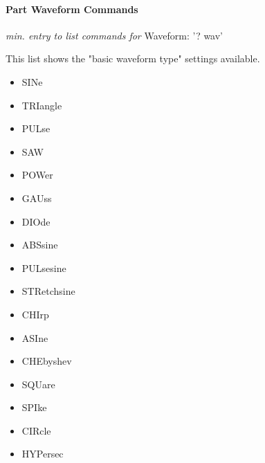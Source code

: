\paragraph{Part Waveform Commands}
\label{paragraph:command_line_part_waveform_commands}
\textsl{min. entry to list commands for} Waveform: '? wav'

   This list shows the "basic waveform type" settings available.

   \begin{itemize}
      \item SINe
      \item TRIangle
      \item PULse
      \item SAW
      \item POWer
      \item GAUss
      \item DIOde
      \item ABSsine
      \item PULsesine
      \item STRetchsine
      \item CHIrp
      \item ASIne
      \item CHEbyshev
      \item SQUare
      \item SPIke
      \item CIRcle
      \item HYPersec
   \end{itemize}

